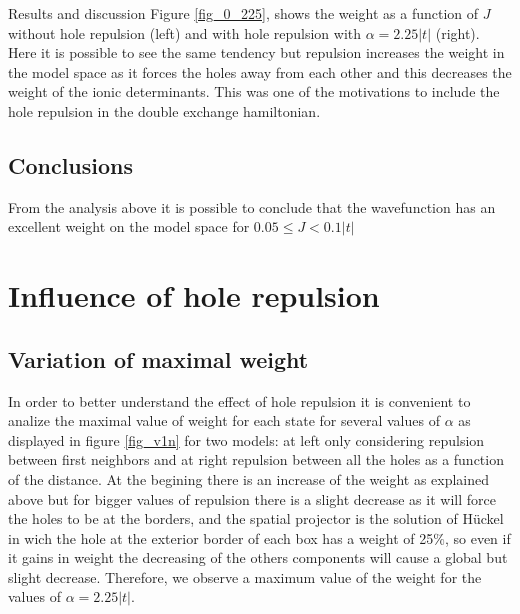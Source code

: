 \documentclass[12pt,twoside]{report}
\begin{document}
\begin{chapter}{Results and discussion}
	Figure \ref{fig_0_225}, shows the weight as a function of $J$ without hole
	repulsion (left) and with hole repulsion with $\alpha=2.25|t|$ (right). Here it
	is possible to see the same tendency but repulsion increases the weight in
	the model space as it forces the holes away from each other and this
	decreases the weight of the ionic determinants. This was one of the
	motivations to include the hole repulsion in the double exchange hamiltonian.

	\subsection{Conclusions}

	From the analysis above it is possible to conclude that the wavefunction has
	an excellent weight on the model space for $0.05 \leq J < 0.1|t|$

	\section{Influence of hole repulsion}

	\subsection{Variation of maximal weight}

	In order to better understand the effect of hole repulsion it is convenient
	to analize the maximal value of weight for each state for several values of
	$\alpha$ as displayed in figure \ref{fig_v1n} for two models: at left only
	considering repulsion between first neighbors and at right repulsion between
	all the holes as a function of the distance. At the begining there is an
	increase of the weight as explained above but for bigger values of repulsion
	there is a slight decrease as it will force the holes to be at the borders,
	and the spatial projector is the solution of Hückel in wich the hole at the
	exterior border of each box has a weight of 25$\%$, so even if it gains in
	weight the decreasing of the others components will cause a global but
	slight decrease. Therefore, we observe a maximum value of the weight for the
	values of $\alpha=2.25|t|$.
	

\end{chapter}
\end{document}
